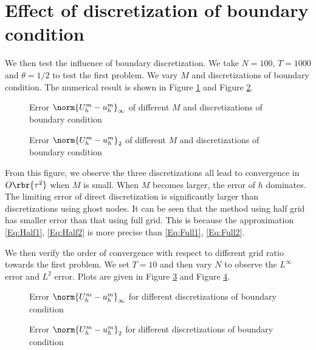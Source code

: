 \documentclass[english, nochinese]{pnote}
\begin{document}
\section{Effect of discretization of boundary condition}

We then test the influence of boundary discretization. We take $ N = 100 $, $ T = 1000 $ and $ \theta = 1 / 2 $ to test the first problem. We vary $M$ and discretizations of boundary condition. The numerical result is shown in Figure \ref{Fig:BoundConvI} and Figure \ref{Fig:BoundConv2}.


\begin{figure}[htbp]
\centering
\scalebox{0.75}{}
\caption{Error $ \norm{ U_h^m - u_h^m }_{\infty} $ of different $M$ and discretizations of boundary condition}
\label{Fig:BoundConvI}
\end{figure}

\begin{figure}[htbp]
\centering
\scalebox{0.75}{}
\caption{Error $ \norm{ U_h^m - u_h^m }_2 $ of different $M$ and discretizations of boundary condition}
\label{Fig:BoundConv2}
\end{figure}

From this figure, we observe the three discretizations all lead to convergence in $ O \rbr{\tau^2} $ when $M$ is small. When $M$ becomes larger, the error of $h$ dominates. The limiting error of direct discretization is significantly larger than discretizations using ghost nodes. It can be seen that the method using half grid has smaller error than that using full grid. This is because the approximation \eqref{Eq:Half1}, \eqref{Eq:Half2} is more precise than \eqref{Eq:Full1}, \eqref{Eq:Full2}.

We then verify the order of convergence with respect to different grid ratio towards the first problem. We set $ T = 10 $ and then vary $N$ to observe the $L^{\infty}$ error and $L^2$ error. Plots are given in Figure \ref{Fig:BConvI} and Figure \ref{Fig:BConv2}.

\begin{figure}
\centering
\scalebox{0.75}{}
\caption{Error $ \norm{ U_h^m - u_h^m }_{\infty} $ for different discretizations of boundary condition}
\label{Fig:BConvI}
\end{figure}

\begin{figure}
\centering
\scalebox{0.75}{}
\caption{Error $ \norm{ U_h^m - u_h^m }_2 $ for different discretizations of boundary condition}
\label{Fig:BConv2}
\end{figure}
\end{document}

